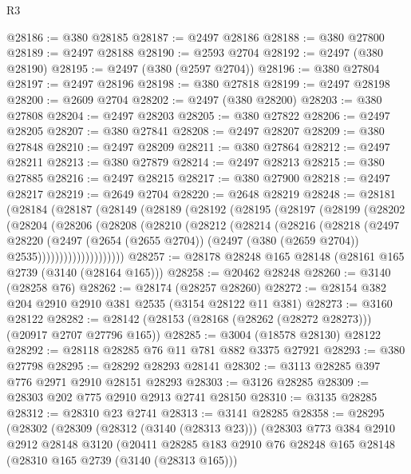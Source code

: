 \begin{lexlean}{R3}
\begin{coremodule}
@28186 := @380 @28185
@28187 := @2497 @28186
@28188 := @380 @27800
@28189 := @2497 @28188
@28190 := @2593 @2704
@28192 := @2497 (@380 @28190)
@28195 := @2497 (@380 (@2597 @2704))
@28196 := @380 @27804
@28197 := @2497 @28196
@28198 := @380 @27818
@28199 := @2497 @28198
@28200 := @2609 @2704
@28202 := @2497 (@380 @28200)
@28203 := @380 @27808
@28204 := @2497 @28203
@28205 := @380 @27822
@28206 := @2497 @28205
@28207 := @380 @27841
@28208 := @2497 @28207
@28209 := @380 @27848
@28210 := @2497 @28209
@28211 := @380 @27864
@28212 := @2497 @28211
@28213 := @380 @27879
@28214 := @2497 @28213
@28215 := @380 @27885
@28216 := @2497 @28215
@28217 := @380 @27900
@28218 := @2497 @28217
@28219 := @2649 @2704
@28220 := @2648 @28219
@28248 := @28181
    (@28184
      (@28187
        (@28149
          (@28189
            (@28192
              (@28195
                (@28197
                  (@28199
                    (@28202
                      (@28204
                        (@28206
                          (@28208
                            (@28210
                              (@28212
                                (@28214
                                  (@28216
                                    (@28218
                                      (@2497
                                        @28220
                                        (@2497
                                          (@2654 (@2655 @2704))
                                          (@2497 (@380 (@2659 @2704)) @2535))))))))))))))))))))
@28257 := @28178 @28248 @165 @28148 (@28161 @165 @2739 (@3140 (@28164 @165)))
@28258 := @20462 @28248
@28260 := @3140 (@28258 @76)
@28262 := @28174 (@28257 @28260)
@28272 := @28154 @382 @204 @2910 @2910 @381 @2535 (@3154 @28122 @11 @381)
@28273 := @3160 @28122
@28282 := @28142 (@28153 (@28168 (@28262 (@28272 @28273))) (@20917 @2707 @27796 @165))
@28285 := @3004 (@18578 @28130) @28122
@28292 := @28118 @28285 @76 @11 @781 @882 @3375 @27921
@28293 := @380 @27798
@28295 := @28292 @28293 @28141
@28302 := @3113 @28285 @397 @776 @2971 @2910 @28151 @28293
@28303 := @3126 @28285
@28309 := @28303 @202 @775 @2910 @2913 @2741 @28150
@28310 := @3135 @28285
@28312 := @28310 @23 @2741
@28313 := @3141 @28285
@28358 := @28295
    (@28302
      (@28309
        (@28312 (@3140 (@28313 @23)))
        (@28303
          @773
          @384
          @2910
          @2912
          @28148
          @3120
          (@20411
            @28285
            @183
            @2910
            @76
            @28248
            @165
            @28148
            (@28310 @165 @2739 (@3140 (@28313 @165)))

\end{coremodule}
\end{lexlean}
